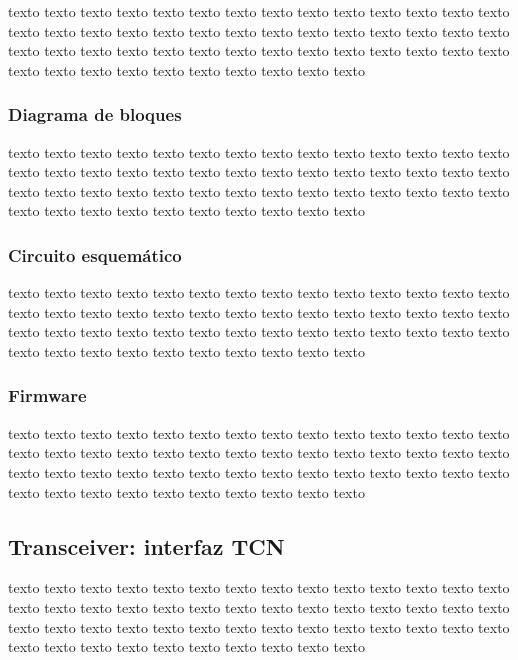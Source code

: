 \documentclass[
11pt, %
]{charter}
\begin{document}
texto texto texto texto texto texto texto texto texto texto texto texto texto texto texto texto texto texto texto texto texto texto texto texto texto texto texto texto texto texto texto texto texto texto texto texto texto texto texto texto texto texto texto texto texto texto texto texto texto texto texto texto 



\subsubsection{Diagrama de bloques}

texto texto texto texto texto texto texto texto texto texto texto texto texto texto texto texto texto texto texto texto texto texto texto texto texto texto texto texto texto texto texto texto texto texto texto texto texto texto texto texto texto texto texto texto texto texto texto texto texto texto texto texto 


\subsubsection{Circuito esquemático}

texto texto texto texto texto texto texto texto texto texto texto texto texto texto texto texto texto texto texto texto texto texto texto texto texto texto texto texto texto texto texto texto texto texto texto texto texto texto texto texto texto texto texto texto texto texto texto texto texto texto texto texto 


	

\subsubsection{Firmware}

texto texto texto texto texto texto texto texto texto texto texto texto texto texto texto texto texto texto texto texto texto texto texto texto texto texto texto texto texto texto texto texto texto texto texto texto texto texto texto texto texto texto texto texto texto texto texto texto texto texto texto texto 


\pagebreak
\subsection{Transceiver: interfaz TCN}

texto texto texto texto texto texto texto texto texto texto texto texto texto texto texto texto texto texto texto texto texto texto texto texto texto texto texto texto texto texto texto texto texto texto texto texto texto texto texto texto texto texto texto texto texto texto texto texto texto texto texto texto 
\end{document}
